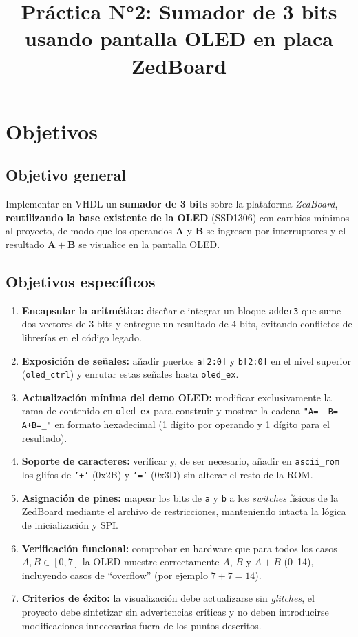 \documentclass[a4paper,12pt]{article}
\title{Práctica N°2: Sumador de 3 bits usando pantalla OLED en placa ZedBoard}
\date{}
\begin{document}
\maketitle
\tableofcontents
\newpage

\section{Objetivos}

\subsection{Objetivo general}
Implementar en VHDL un \textbf{sumador de 3 bits} sobre la plataforma \textit{ZedBoard}, \textbf{reutilizando la base existente de la OLED} (SSD1306) con cambios mínimos al proyecto, de modo que los operandos \(\mathbf{A}\) y \(\mathbf{B}\) se ingresen por interruptores y el resultado \(\mathbf{A+B}\) se visualice en la pantalla OLED.

\subsection{Objetivos específicos}
\begin{enumerate}
    \item \textbf{Encapsular la aritmética:} diseñar e integrar un bloque \texttt{adder3} que sume dos vectores de 3 bits y entregue un resultado de 4 bits, evitando conflictos de librerías en el código legado.
    \item \textbf{Exposición de señales:} añadir puertos \texttt{a[2:0]} y \texttt{b[2:0]} en el nivel superior (\texttt{oled\_ctrl}) y enrutar estas señales hasta \texttt{oled\_ex}.
    \item \textbf{Actualización mínima del demo OLED:} modificar exclusivamente la rama de contenido en \texttt{oled\_ex} para construir y mostrar la cadena \texttt{"A=\_ B=\_ A+B=\_"} en formato hexadecimal (1 dígito por operando y 1 dígito para el resultado).
    \item \textbf{Soporte de caracteres:} verificar y, de ser necesario, añadir en \texttt{ascii\_rom} los glifos de \texttt{'+'} (0x2B) y \texttt{'='} (0x3D) sin alterar el resto de la ROM.
    \item \textbf{Asignación de pines:} mapear los bits de \texttt{a} y \texttt{b} a los \textit{switches} físicos de la ZedBoard mediante el archivo de restricciones, manteniendo intacta la lógica de inicialización y SPI.
    \item \textbf{Verificación funcional:} comprobar en hardware que para todos los casos \(A,B \in [0,7]\) la OLED muestre correctamente \(A\), \(B\) y \(A+B\) (0–14), incluyendo casos de “overflow” (por ejemplo \(7+7=14\)).
    \item \textbf{Criterios de éxito:} la visualización debe actualizarse sin \textit{glitches}, el proyecto debe sintetizar sin advertencias críticas y no deben introducirse modificaciones innecesarias fuera de los puntos descritos.
\end{enumerate}
\end{document}
